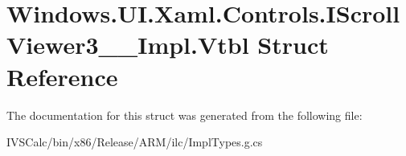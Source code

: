 \hypertarget{struct_windows_1_1_u_i_1_1_xaml_1_1_controls_1_1_i_scroll_viewer3_____impl_1_1_vtbl}{}\section{Windows.\+U\+I.\+Xaml.\+Controls.\+I\+Scroll\+Viewer3\+\_\+\+\_\+\+Impl.\+Vtbl Struct Reference}
\label{struct_windows_1_1_u_i_1_1_xaml_1_1_controls_1_1_i_scroll_viewer3_____impl_1_1_vtbl}


The documentation for this struct was generated from the following file\+:\begin{DoxyCompactItemize}
\item 
I\+V\+S\+Calc/bin/x86/\+Release/\+A\+R\+M/ilc/Impl\+Types.\+g.\+cs\end{DoxyCompactItemize}
